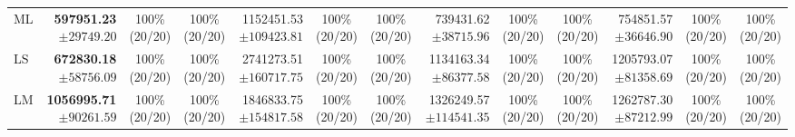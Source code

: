 \documentclass[10pt]{article}
\begin{document}
\begin{table}[!htbp]
\begin{tabular}{@{}l*{4}{rcc}@{}}
ML & \shortstack[r]{\textbf{597951.23}\\$\pm 29749.20$} & \shortstack[c]{100\%\\(20/20)} & \shortstack[c]{100\%\\(20/20)} & \shortstack[r]{1152451.53\\$\pm 109423.81$} & \shortstack[c]{100\%\\(20/20)} & \shortstack[c]{100\%\\(20/20)} & \shortstack[r]{739431.62\\$\pm 38715.96$} & \shortstack[c]{100\%\\(20/20)} & \shortstack[c]{100\%\\(20/20)} & \shortstack[r]{754851.57\\$\pm 36646.90$} & \shortstack[c]{100\%\\(20/20)} & \shortstack[c]{100\%\\(20/20)} \\
LS & \shortstack[r]{\textbf{672830.18}\\$\pm 58756.09$} & \shortstack[c]{100\%\\(20/20)} & \shortstack[c]{100\%\\(20/20)} & \shortstack[r]{2741273.51\\$\pm 160717.75$} & \shortstack[c]{100\%\\(20/20)} & \shortstack[c]{100\%\\(20/20)} & \shortstack[r]{1134163.34\\$\pm 86377.58$} & \shortstack[c]{100\%\\(20/20)} & \shortstack[c]{100\%\\(20/20)} & \shortstack[r]{1205793.07\\$\pm 81358.69$} & \shortstack[c]{100\%\\(20/20)} & \shortstack[c]{100\%\\(20/20)} \\
LM & \shortstack[r]{\textbf{1056995.71}\\$\pm 90261.59$} & \shortstack[c]{100\%\\(20/20)} & \shortstack[c]{100\%\\(20/20)} & \shortstack[r]{1846833.75\\$\pm 154817.58$} & \shortstack[c]{100\%\\(20/20)} & \shortstack[c]{100\%\\(20/20)} & \shortstack[r]{1326249.57\\$\pm 114541.35$} & \shortstack[c]{100\%\\(20/20)} & \shortstack[c]{100\%\\(20/20)} & \shortstack[r]{1262787.30\\$\pm 87212.99$} & \shortstack[c]{100\%\\(20/20)} & \shortstack[c]{100\%\\(20/20)} \\

\end{tabular}
\end{table}
\end{document}
